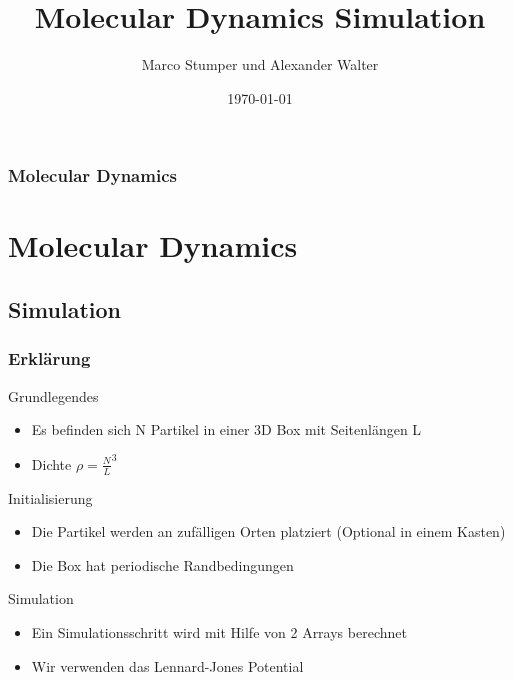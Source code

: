 \documentclass[11pt]{beamer}
\author{Marco Stumper und Alexander Walter} %
\title{Molecular Dynamics Simulation}
\institute{Universität Hamburg}
\date{\today} %
\begin{document}
\begin{frame}[plain]
  \titlepage
\end{frame}

\begin{frame}
  \begin{minipage}{0.50\textwidth}
	\frametitle{Molecular Dynamics}
	\tableofcontents
  \end{minipage}
  \begin{minipage}{0.45\textwidth}
  \hspace*{-1.3cm}
  \end{minipage}
\end{frame}


\section{Molecular Dynamics}

\subsection{Simulation}

\begin{frame}
  \frametitle{Erklärung}
  \vspace*{-0.3cm}
  \begin{block}{Grundlegendes}
    \begin{itemize}
      \item Es befinden sich N Partikel in einer 3D Box mit Seitenlängen L
      \item Dichte ${\rho = \frac{N}{L}^3}$
      \end{itemize}
  \end{block}
  \pause
  \begin{block}{Initialisierung}
    \begin{itemize}
      \item Die Partikel werden an zufälligen Orten platziert (Optional in einem Kasten)
      \item Die Box hat periodische Randbedingungen
    \end{itemize}
  \end{block}
  \pause
  \begin{block}{Simulation}
    \begin{itemize}
      \item Ein Simulationsschritt wird mit Hilfe von 2 Arrays berechnet
      \item Wir verwenden das Lennard-Jones Potential
    \end{itemize}
  \end{block}
\end{frame}
\end{document}
